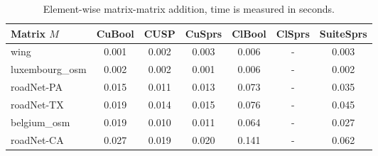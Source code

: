 {\setlength{\tabcolsep}{0.3em}
\begin{table}[t]
\centering
{
\caption{Element-wise matrix-matrix addition, time is measured in seconds.}
\label{table:eval_ma_results}
\scriptsize
{}
\begin{tabular}{|l|c|c|c|c|c|c|}
\hline

Matrix $M$      & CuBool  & CUSP    & CuSprs  & ClBool   & ClSprs  & SuiteSprs \\
\hline
\hline
wing            & 0.001   & 0.002   & 0.003   & 0.006    & -       & 0.003   \\
luxembourg\_osm & 0.002   & 0.002   & 0.001   & 0.006    & -       & 0.002   \\
roadNet-PA      & 0.015   & 0.011   & 0.013   & 0.073    & -       & 0.035   \\
roadNet-TX      & 0.019   & 0.014   & 0.015   & 0.076    & -       & 0.045   \\
belgium\_osm    & 0.019   & 0.010   & 0.011   & 0.064    & -       & 0.027   \\
roadNet-CA      & 0.027   & 0.019   & 0.020   & 0.141    & -       & 0.062   \\

\hline
\end{tabular}
}
\end{table}
}